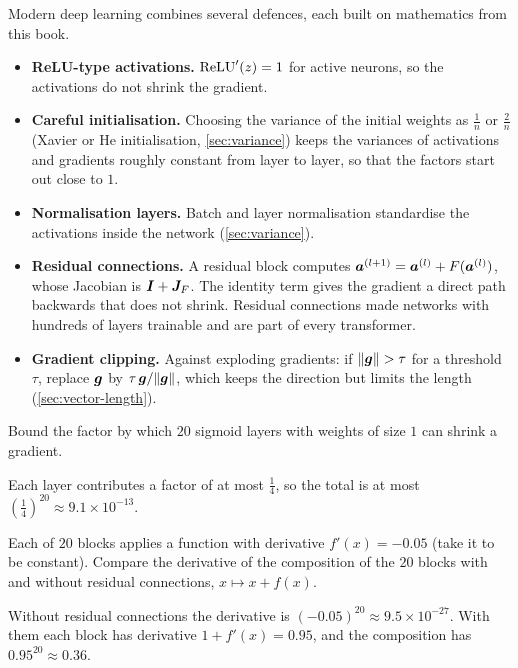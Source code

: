 Modern deep learning combines several defences, each built on mathematics from
this book.
\begin{itemize}
  \item \textbf{ReLU-type activations.} $\operatorname{ReLU}'(z) = 1$ for active neurons, so
    the activations do not shrink the gradient.
  \item \textbf{Careful initialisation.} Choosing the variance of the initial
    weights as $\frac1n$ or $\frac2n$ (Xavier or He initialisation,
    \cref{sec:variance}) keeps the variances of activations and gradients roughly
    constant from layer to layer, so that the factors start out close to $1$.
  \item \textbf{Normalisation layers.} Batch and layer normalisation standardise
    the activations inside the network (\cref{sec:variance}).
  \item \textbf{Residual connections.} A residual block computes
    $\bm{a}^{(l+1)} = \bm{a}^{(l)} + F(\bm{a}^{(l)})$, whose Jacobian is $\bm{I} + \bm{J}_F$.
    The identity term gives the gradient a direct path backwards that does not
    shrink. Residual connections made networks with hundreds of layers trainable
    and are part of every transformer.
  \item \textbf{Gradient clipping.} Against exploding gradients: if
    $\lVert\bm{g}\rVert > \tau$ for a threshold $\tau$, replace $\bm{g}$ by
    $\tau\,\bm{g}/\lVert\bm{g}\rVert$, which keeps the direction but limits the length
    (\cref{sec:vector-length}).
\end{itemize}

\sectionexercises

\begin{exercise}
Bound the factor by which $20$ sigmoid layers with weights of size $1$ can shrink a
gradient.
\end{exercise}
\begin{solution}
Each layer contributes a factor of at most $\tfrac14$, so the total is at most
$\left(\tfrac14\right)^{20} \approx 9.1\times10^{-13}$.
\end{solution}

\begin{exercise}
Each of $20$ blocks applies a function with derivative $f'(x) = -0.05$ (take it to
be constant). Compare the derivative of the composition of the $20$ blocks with
and without residual connections, $x \mapsto x + f(x)$.
\end{exercise}
\begin{solution}
Without residual connections the derivative is $(-0.05)^{20} \approx 9.5\times
10^{-27}$. With them each block has derivative $1 + f'(x) = 0.95$, and the
composition has $0.95^{20} \approx 0.36$.
\end{solution}

